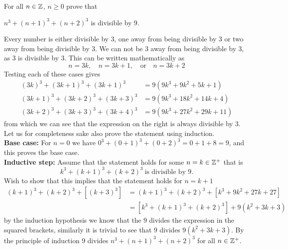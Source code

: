 \documentclass[a4paper, english, 12pt]{article} %
\begin{document}
\begin{problem}
  For all $n \in \mathbb{Z}$, $n \geq 0$ prove that
  \begin{subproblem}[4]
    $n^3 + (n+1)^3 + (n + 2)^3$ is divisible by $9$.
  \end{subproblem}
\end{problem}

\begin{answer}
  Every number is either divisible by 3, one away from being divisible by 3 or
  two away from being divisible by 3. We can not be 3 away from being divisible
  by 3, as $3$ is divisible by $3$. This can be written mathematically as
  \begin{equation*}
    n = 3k, \quad n = 3k + 1, \quad \text{or} \quad n = 3k + 2
  \end{equation*}
  Testing each of these cases gives
  \begin{align*}
    (3k)^3 + (3k+1)^3 + (3k + 1)^3 & = 9(9k^3 + 9k^2 + 5k + 1) \\ 
    (3k+1)^3 + (3k+2)^3 + (3k + 3)^3 & = 9(9k^3 + 18k^2 + 14k + 4) \\ 
    (3k+2)^3 + (3k+3)^3 + (3k + 4)^3 & = 9(9k^3 + 27k^2 + 29k + 11)  
  \end{align*}
  from which we can see that the expression on the right is always divisible by
  $3$. Let us for completeness sake also prove the statement using induction. \\
  \textbf{Base case:} For $n=0$ we have $0^3 + (0+1)^3 + (0+2)^3 = 0 + 1 + 8 = 9$,
  and this proves the base case. \\
  \textbf{Inductive step:} Assume that the statement holds for some $n = k \in \mathbb{Z}^+$
  that is
  \begin{equation*}
    k^3 + (k+1)^3 + (k+2)^3 \ \text{is divisible by $9$.}
  \end{equation*}
  Wish to show that this implies that the statement holds for $n = k + 1$
  \begin{align*}
        (k+1)^3 + (k+2)^3 + [(k+3)^3]
    & = (k+1)^3 + (k+2)^3 + [k^3 + 9k^2 + 27k + 27] \\
    & = [k^3 + (k+1)^3 + (k+2)^3] + 9(k^2 + 3k + 3)
  \end{align*}
  by the induction hypothesis we know that the $9$ divides the expression in the
  squared brackets, similarly it is trivial to see that $9$ divides $9(k^2 + 3k +
  3)$. By the principle of induction $9$ divides $n^3 + (n+1)^3 + (n+2)^3$ for
  all $n \in \mathbb{Z}^+$. 
\end{answer}
\end{document}
